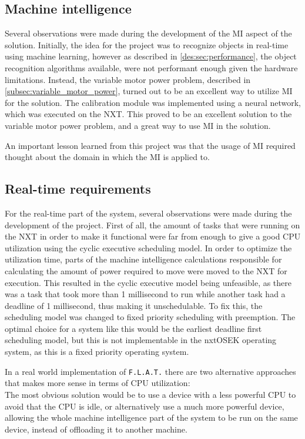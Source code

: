 \subsection{Machine intelligence}
Several observations were made during the development of the MI aspect of the solution.
Initially, the idea for the project was to recognize objects in real-time using machine learning, however as described in \autoref{des:sec:performance}, the object recognition algorithms available, were not performant enough given the hardware limitations.
Instead, the variable motor power problem, described in \autoref{subsec:variable_motor_power}, turned out to be an excellent way to utilize MI for the solution.
The calibration module was implemented using a neural network, which was executed on the NXT.
This proved to be an excellent solution to the variable motor power problem, and a great way to use MI in the solution.

An important lesson learned from this project was that the usage of MI required thought about the domain in which the MI is applied to.


\subsection{Real-time requirements}
For the real-time part of the system, several observations were made during the development of the project.
First of all, the amount of tasks that were running on the NXT in order to make it functional were far from enough to give a good CPU utilization using the cyclic executive scheduling model.
In order to optimize the utilization time, parts of the machine intelligence calculations responsible for calculating the amount of power required to move were moved to the NXT for execution.
This resulted in the cyclic executive model being unfeasible, as there was a task that took more than 1 millisecond to run while another task had a deadline of 1 millisecond, thus making it unschedulable. 
To fix this, the scheduling model was changed to fixed priority scheduling with preemption.
The optimal choice for a system like this would be the earliest deadline first scheduling model, but this is not implementable in the nxtOSEK operating system, as this is a fixed priority operating system.

In a real world implementation of \texttt{F.L.A.T.} there are two alternative approaches that makes more sense in terms of CPU utilization: \\
The most obvious solution would be to use a device with a less powerful CPU to avoid that the CPU is idle, or alternatively use a much more powerful device, allowing the whole machine intelligence part of the system to be run on the same device, instead of offloading it to another machine.

